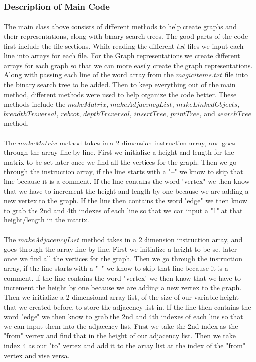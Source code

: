 \documentclass[letterpaper, 10pt,DIV=13]{scrartcl}
\numberwithin{equation}{section} %
\numberwithin{figure}{section} %
\numberwithin{table}{section} %
\begin{document}
\subsubsection{Description of Main Code}
\paragraph{} The main class above consists of different methods to help create graphs and their representations, along with binary search trees. The good parts of the code first include the file sections. While reading the different $txt$ files we input each line into arrays for each file. For the Graph representations we create different arrays for each graph so that we can more easily create the graph representations. Along with passing each line of the word array from the $magicitems.txt$ file into the binary search tree to be added. Then to keep everything out of the main method, different methods were used to help organize the code better. These methods include the $makeMatrix$, $makeAdjacencyList$, $makeLinkedObjects$, $breadthTraversal$, $reboot$, $depthTraversal$, $insertTree$, $printTree$, and $searchTree$ method.
\paragraph{} The $makeMatrix$ method takes in a 2 dimension instruction array, and goes through the array line by line. First we initialize a height and length for the matrix to be set later once we find all the vertices for the graph. Then we go through the instruction array, if the line starts with a "--" we know to skip that line because it is a comment. If the line contains the word "vertex" we then know that we have to increment the height and length by one because we are adding a new vertex to the graph. If the line then contains the word "edge" we then know to grab the 2nd and 4th indexes of each line so that we can input a "1" at that height/length in the matrix. 

\paragraph{} The $makeAdjacencyList$ method takes in a 2 dimension instruction array, and goes through the array line by line. First we initialize a height to be set later once we find all the vertices for the graph. Then we go through the instruction array, if the line starts with a "--" we know to skip that line because it is a comment. If the line contains the word "vertex" we then know that we have to increment the height by one because we are adding a new vertex to the graph. Then we initialize a 2 dimensional array list, of the size of our variable height that we created before, to store the adjacency list in. If the line then contains the word "edge" we then know to grab the 2nd and 4th indexes of each line so that we can input them into the adjacency list. First we take the 2nd index as the "from" vertex and find that in the height of our adjacency list. Then we take index 4 as our "to" vertex and add it to the array list at the index of the "from" vertex and vise versa.  
\end{document}
